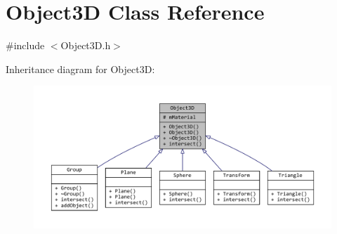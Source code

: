 \hypertarget{classObject3D}{\section{Object3\+D Class Reference}
\label{classObject3D}
}


{\ttfamily \#include $<$Object3\+D.\+h$>$}



Inheritance diagram for Object3\+D\+:
\nopagebreak
\begin{figure}[H]
\begin{center}
\leavevmode
\includegraphics[width=350pt]{classObject3D__inherit__graph}
\end{center}
\end{figure}


